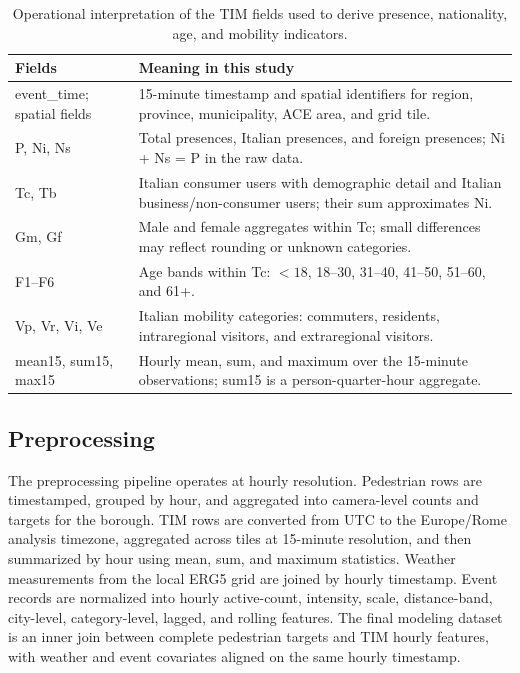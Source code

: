 \begin{table}
\caption{Operational interpretation of the TIM fields used to derive presence, nationality, age, and mobility indicators.}
\label{tab:tim-dictionary}
\centering
\scriptsize
\begin{tabularx}{\textwidth}{lX}
\toprule
Fields & Meaning in this study \\
\midrule
event\_time; spatial fields & 15-minute timestamp and spatial identifiers for region, province, municipality, ACE area, and grid tile. \\
P, Ni, Ns & Total presences, Italian presences, and foreign presences; Ni + Ns = P in the raw data. \\
Tc, Tb & Italian consumer users with demographic detail and Italian business/non-consumer users; their sum approximates Ni. \\
Gm, Gf & Male and female aggregates within Tc; small differences may reflect rounding or unknown categories. \\
F1--F6 & Age bands within Tc: $<18$, 18--30, 31--40, 41--50, 51--60, and 61+. \\
Vp, Vr, Vi, Ve & Italian mobility categories: commuters, residents, intraregional visitors, and extraregional visitors. \\
mean15, sum15, max15 & Hourly mean, sum, and maximum over the 15-minute observations; sum15 is a person-quarter-hour aggregate. \\
\bottomrule
\end{tabularx}
\end{table}

\subsection{Preprocessing}

The preprocessing pipeline operates at hourly resolution. Pedestrian rows are
timestamped, grouped by hour, and aggregated into camera-level counts and
targets for the borough. TIM rows are converted from UTC to the Europe/Rome
analysis timezone, aggregated across tiles at 15-minute resolution, and then
summarized by hour using mean, sum, and maximum statistics. Weather measurements
from the local ERG5 grid are joined by hourly timestamp. Event records
are normalized into hourly active-count, intensity, scale, distance-band,
city-level, category-level, lagged, and rolling features. The final modeling
dataset is an inner join between complete pedestrian targets and TIM hourly
features, with weather and event covariates aligned on the same hourly
timestamp.

